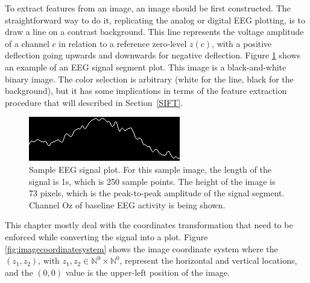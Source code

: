 \vspace{3pt}

To extract features from an image, an image should be first constructed.  The straightforward way to do it, replicating the analog or digital EEG plotting, is to draw a line on a contrast background.  This line represents the voltage amplitude of a channel $c$ in relation to a reference zero-level $z(c)$, with a positive deflection going upwards and downwards for negative deflection.  Figure \ref{fig:plottingsample} shows an example of an EEG signal segment plot.  This image is a black-and-white binary image.  The color selection is arbitrary (white for the line, black for the background), but it has some implications in terms of the feature extraction procedure that will described in Section~\ref{SIFT}.

\begin{figure}[]
\centering
\includegraphics[scale=1.5]{images/plottingsample.png}
\caption[EEG Signal Mapping to Images]{Sample EEG signal plot.  For this sample image, the length of the signal is 1s, which is 250 sample points.  The height of the image is 73 pixels, which is the peak-to-peak amplitude of the signal segment.  Channel Oz of baseline EEG activity is being shown.}
\label{fig:plottingsample}
\end{figure}

This chapter mostly deal with the coordinates transformation that need to be enforced while converting the signal into a plot.  Figure \ref{fig:imagecoordinatesystem} shows the image coordinate system where the $(z_1,z_2)$, with  $z_1,z_2 \in \mathbb{N}^0 \times \mathbb{N}^0$, represent the horizontal and vertical locations, and the $(0,0)$ value is the upper-left position of the image. 

